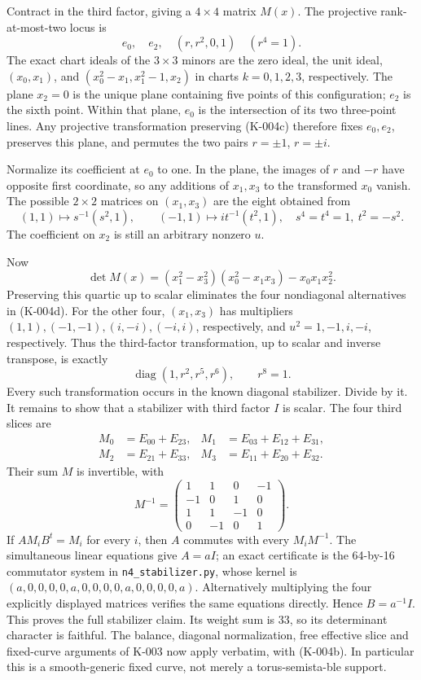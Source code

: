 Contract in the third factor, giving a $4\times4$ matrix $M(x)$.
The projective rank-at-most-two locus is
\[
 e_0,\quad e_2,\quad (r,r^2,0,1)\quad(r^4=1).                \tag{K-004c}
\]
The exact chart ideals of the $3\times3$ minors are the zero ideal,
the unit ideal, $(x_0,x_1)$, and
$(x_0^2-x_1,x_1^2-1,x_2)$ in charts $k=0,1,2,3$, respectively.
The plane $x_2=0$ is the unique plane containing five points of this
configuration; $e_2$ is the sixth point. Within that plane, $e_0$ is
the intersection of its two three-point lines. Any projective
transformation preserving (K-004c) therefore fixes $e_0,e_2$,
preserves this plane, and permutes the two pairs $r=\pm1$, $r=\pm i$.

Normalize its coefficient at $e_0$ to one. In the plane, the images
of $r$ and $-r$ have opposite first coordinate, so any additions of
$x_1,x_3$ to the transformed $x_0$ vanish. The possible $2\times2$
matrices on $(x_1,x_3)$ are the eight obtained from
\[
 (1,1)\longmapsto s^{-1}(s^2,1),\qquad
 (-1,1)\longmapsto it^{-1}(t^2,1),
 \quad s^4=t^4=1,\ t^2=-s^2.                                \tag{K-004d}
\]
The coefficient on $x_2$ is still an arbitrary nonzero $u$.

Now
\[
 \det M(x)=(x_1^2-x_3^2)(x_0^2-x_1x_3)-x_0x_1x_2^2.          \tag{K-004e}
\]
Preserving this quartic up to scalar eliminates the four
nondiagonal alternatives in (K-004d). For the other four,
$(x_1,x_3)$ has multipliers
$(1,1),(-1,-1),(i,-i),(-i,i)$, respectively, and
$u^2=1,-1,i,-i$, respectively. Thus the third-factor transformation,
up to scalar and inverse transpose, is exactly
\[
               \operatorname{diag}(1,r^2,r^5,r^6),\qquad r^8=1.
                                                               \tag{K-004f}
\]
Every such transformation occurs in the known diagonal stabilizer.
Divide by it. It remains to show that a stabilizer with third factor
$I$ is scalar. The four third slices are
\[
\begin{aligned}
M_0&=E_{00}+E_{23},&M_1&=E_{03}+E_{12}+E_{31},\\
M_2&=E_{21}+E_{33},&M_3&=E_{11}+E_{20}+E_{32}.
\end{aligned}                                                    \tag{K-004g}
\]
Their sum $M$ is invertible, with
\[
 M^{-1}=\begin{pmatrix}1&1&0&-1\\-1&0&1&0\\1&1&-1&0\\0&-1&0&1\end{pmatrix}.
\]
If $AM_iB^t=M_i$ for every $i$, then $A$ commutes with every
$M_iM^{-1}$. The simultaneous linear equations give
$A=aI$; an exact certificate is the 64-by-16 commutator system
in \texttt{n4\_stabilizer.py}, whose kernel is
$(a,0,0,0,0,a,0,0,0,0,a,0,0,0,0,a)$.
Alternatively multiplying the four explicitly displayed matrices
verifies the same equations directly. Hence $B=a^{-1}I$.
This proves the full stabilizer claim. Its weight sum is $33$, so
its determinant character is faithful. The balance, diagonal
normalization, free effective slice and fixed-curve arguments of
K-003 now apply verbatim, with (K-004b). In particular this is a
smooth-generic fixed curve, not merely a torus-semista-ble support.

